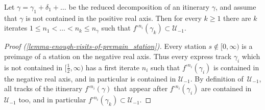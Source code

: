 \begin{lemma} \label{lemma-enough-visits-of-premain_station}
	Let $\gamma = \gamma_1 + \delta_1 + \dots $ be the reduced decomposition of an itinerary $\gamma$, and assume that $\gamma$ is not contained in the positive real axis. Then for every $k \geq 1$ there are $k$ iterates $1  \leq n_1 < \dots < n_k \leq n_\gamma$ such that $f^{\circ {n_i}}(\gamma_k) \subset \mathcal U_{-1}$.
\end{lemma}

\begin{proof}[Proof (\cref{lemma-enough-visits-of-premain_station})]
	Every station $s \not \in [0,\infty)$ is a preimage of a station on the negative real axis. Thus every express track $\gamma_i$ which is not contained in $[\tfrac 12, \infty)$ has a first iterate $n_i$ such that $f^{\circ n_i}(\gamma_i)$ is contained in the negative real axis, and in particular is contained in $\mathcal U_{-1}$. By definition of $\,\mathcal U_{-1}$, all tracks of the itinerary $f^{\circ n_i}(\gamma)$ that appear after $f^{\circ n_i}(\gamma_i)$ are contained in $\mathcal U_{-1}$ too, and in particular $f^{\circ n_i}(\gamma_k) \subset \mathcal U_{-1}$.
\end{proof}
